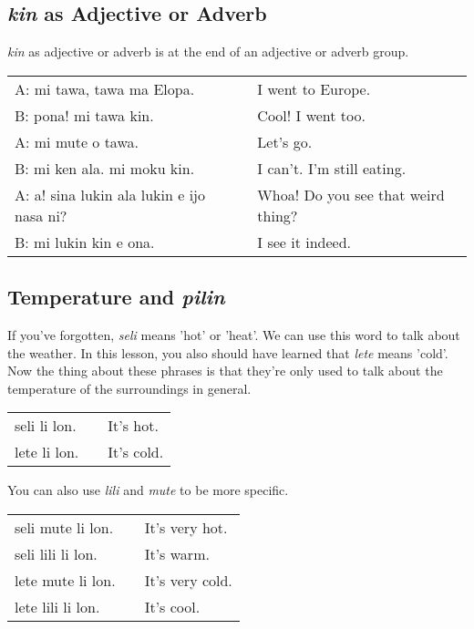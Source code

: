 {\subsection*{\textit{kin} as Adjective or Adverb}
%
%
\textit{kin} as adjective or adverb is at the end of an adjective or adverb group.

\begin{supertabular}{p{5,5cm}|ll}
A: mi tawa, tawa ma Elopa. && I went to Europe. \\
B: pona! mi tawa kin. && Cool! I went too. \\
A: mi mute o tawa. && Let's go. \\
B: mi ken ala. mi moku kin. && I can't. I'm still eating. \\
A: a! sina lukin ala lukin e ijo nasa ni? && Whoa! Do you see that weird thing? \\
B: mi lukin kin e ona. && I see it indeed. \\
\end{supertabular} 

%
%
%
%
\subsection*{Temperature and \textit{pilin}}
%
%
If you've forgotten, \textit{seli} means 'hot' or 'heat'. 
We can use this word to talk about the weather. 
In this lesson, you also should have learned that \textit{lete} means 'cold'. 
Now the thing about these phrases is that they're only used to talk about the temperature of the surroundings in general. 

\begin{supertabular}{p{5,5cm}|ll}
seli li lon. && It's hot. \\
lete li lon. && It's cold. \\
\end{supertabular} 

You can also use \textit{lili} and \textit{mute} to be more specific. 
 
\begin{supertabular}{p{5,5cm}|ll}
seli mute li lon. && It's very hot. \\
seli lili li lon. && It's warm. \\
lete mute li lon. && It's very cold. \\
lete lili li lon. && It's cool. \\
\end{supertabular} 

}
